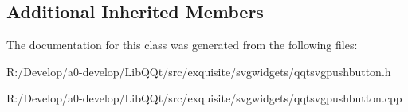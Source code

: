 \subsection*{Additional Inherited Members}


The documentation for this class was generated from the following files\+:\begin{DoxyCompactItemize}
\item 
R\+:/\+Develop/a0-\/develop/\+Lib\+Q\+Qt/src/exquisite/svgwidgets/qqtsvgpushbutton.\+h\item 
R\+:/\+Develop/a0-\/develop/\+Lib\+Q\+Qt/src/exquisite/svgwidgets/qqtsvgpushbutton.\+cpp\end{DoxyCompactItemize}
